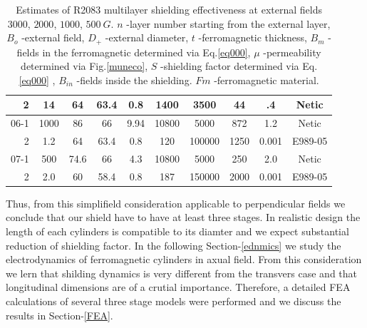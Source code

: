 \documentclass[12pt]{article}
\begin{document}
\begin{table}[htbp]
\begin{center}
\begin{tabular}{|r|c|c|c|c|c|c|c|c|c|}
   2    & 14  & 64  & 63.4& 0.8  & 1400  & 3500       & 44   & .4               & Netic    \\ \hline \hline
 06-1    & 1000& 86  & 66  & 9.94 & 10800 & 5000       & 872  & 1.2    & Netic    \\ \hline
    2    & 1.2 & 64  & 63.4& 0.8  &  120  & 100000     & 1250 & 0.001  & E989-05  \\ \hline \hline
 07-1    & 500 & 74.6& 66  & 4.3  & 10800 & 5000       & 250  & 2.0    & Netic    \\ \hline
    2    & 2.0 & 60  & 58.4& 0.8  & 187   & 150000     & 2000 & 0.001  & E989-05  \\ \hline
\end{tabular}
\end{center}
\caption{Estimates of R2083 multilayer  shielding effectiveness at
 external fields  $3000$, $2000$, $1000$, $500~G$.
 $n$
-layer number starting from the external layer,
 $B_{o}$
-external field,
$D_+$
-external diameter,
$t$
-ferromagnetic thickness,
$B_m$
 -fields in the ferromagnetic determined via Eq.\ref{eq000},
$\mu$
-permeability determined via Fig.\ref{muneco},
$S$
-shielding factor  determined via Eq.\ref{eq000} ,
$B_{in}$
-fields inside the shielding.
$Fm$
-ferromagnetic material.
\label{cal2}}
\end{table}



 
Thus, from this simplifield consideration applicable to  perpendicular fields 
we conclude that our shield have to have  at least three stages.  
In realistic design the length of each cylinders is compatible to its diamter and we expect substantial reduction of shielding factor.
In  the following Section-\ref{ednmics}  we study  the electrodynamics of   ferromagnetic cylinders  in axual 
field.  From this consideration  we lern that shilding dynamics  is very different from the transvers case and that 
 longitudinal dimensions are of a crutial importance. 
Therefore, a detailed FEA calculations of several 
three stage models were performed and we discuss the results in Section-\ref{FEA}.
\end{document}
